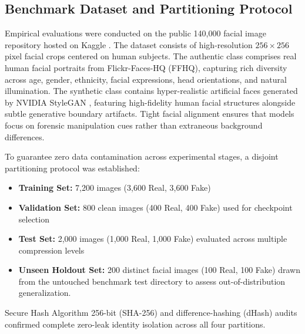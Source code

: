 \documentclass[conference]{IEEEtran}
\begin{document}
\subsection{Benchmark Dataset and Partitioning Protocol}
Empirical evaluations were conducted on the public 140,000 facial image repository hosted on Kaggle \cite{kaggle140k}. The dataset consists of high-resolution $256 \times 256$ pixel facial crops centered on human subjects. The authentic class comprises real human facial portraits from Flickr-Faces-HQ (FFHQ), capturing rich diversity across age, gender, ethnicity, facial expressions, head orientations, and natural illumination. The synthetic class contains hyper-realistic artificial faces generated by NVIDIA StyleGAN \cite{karras2019style}, featuring high-fidelity human facial structures alongside subtle generative boundary artifacts. Tight facial alignment ensures that models focus on forensic manipulation cues rather than extraneous background differences.

To guarantee zero data contamination across experimental stages, a disjoint partitioning protocol was established:
\begin{itemize}
    \item \textbf{Training Set:} 7,200 images (3,600 Real, 3,600 Fake)
    \item \textbf{Validation Set:} 800 clean images (400 Real, 400 Fake) used for checkpoint selection
    \item \textbf{Test Set:} 2,000 images (1,000 Real, 1,000 Fake) evaluated across multiple compression levels
    \item \textbf{Unseen Holdout Set:} 200 distinct facial images (100 Real, 100 Fake) drawn from the untouched benchmark test directory to assess out-of-distribution generalization.
\end{itemize}
Secure Hash Algorithm 256-bit (SHA-256) and difference-hashing (dHash) audits confirmed complete zero-leak identity isolation across all four partitions.
\end{document}
